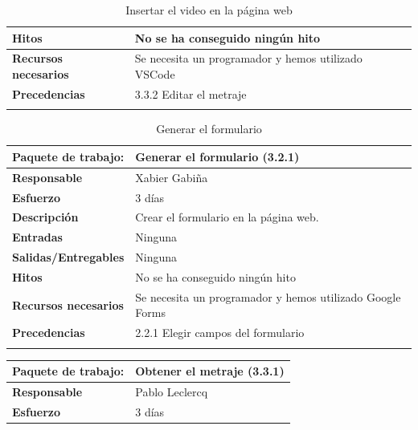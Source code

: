 \documentclass{report}
\begin{document}
\begin{center}
\begin{longtable}{|p{6cm}|p{6cm}|}
                    \hline
                    \textbf{Hitos} & No se ha conseguido ningún hito\\
                    \hline
                    \textbf{Recursos necesarios} & Se necesita un programador y hemos utilizado VSCode\\
                    \hline
                    \textbf{Precedencias} & 3.3.2 Editar el metraje\\
                    \hline
                    \caption{Insertar el video en la página web}
                \end{longtable}
                \begin{longtable}{|p{6cm}|p{6cm}|}
                    \hline
                    \textbf{Paquete de trabajo:} & Generar el formulario (3.2.1)\\
                    \hline
                    \textbf{Responsable} & Xabier Gabiña\\
                    \hline
                    \textbf{Esfuerzo} & 3 días\\
                    \hline
                    \textbf{Descripción} & Crear el formulario en la página web.\\
                    \hline
                    \textbf{Entradas} & Ninguna\\
                    \hline
                    \textbf{Salidas/Entregables} & Ninguna \\
                    \hline
                    \textbf{Hitos} & No se ha conseguido ningún hito\\
                    \hline
                    \textbf{Recursos necesarios} & Se necesita un programador y hemos utilizado Google Forms\\
                    \hline
                    \textbf{Precedencias} & 2.2.1 Elegir campos del formulario\\
                    \hline
                    \caption{Generar el formulario}
                \end{longtable}
                \clearpage
                \begin{longtable}{|p{6cm}|p{6cm}|}
                    \hline
                    \textbf{Paquete de trabajo:} & Obtener el metraje (3.3.1)\\
                    \hline
                    \textbf{Responsable} & Pablo Leclercq\\
                    \hline
                    \textbf{Esfuerzo} & 3 días\\

\end{longtable}
\end{center}
\end{document}

